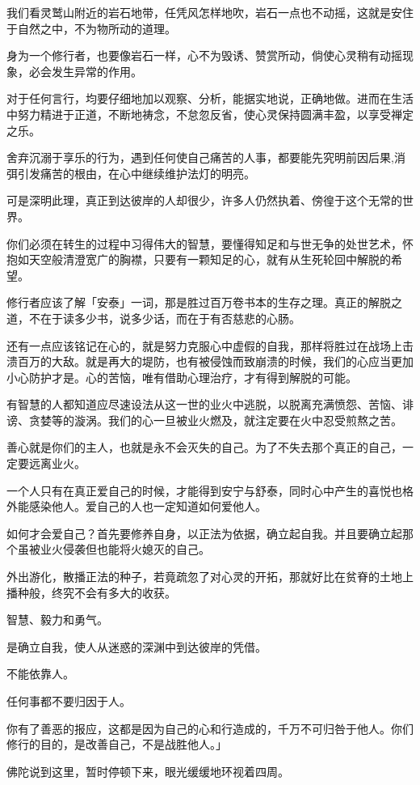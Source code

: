 \documentclass[twoside,openany]{book}
\begin{document}
我们看灵鹫山附近的岩石地带，任凭风怎样地吹，岩石一点也不动摇，这就是安住于自然之中，不为物所动的道理。

身为一个修行者，也要像岩石一样，心不为毁诱、赞赏所动，倘使心灵稍有动摇现象，必会发生异常的作用。

对于任何言行，均要仔细地加以观察、分析，能据实地说，正确地做。进而在生活中努力精进于正道，不断地祷念，不怠忽反省，使心灵保持圆满丰盈，以享受禅定之乐。

舍弃沉溺于享乐的行为，遇到任何使自己痛苦的人事，都要能先究明前因后果,消弭引发痛苦的根由，在心中继续维护法灯的明亮。

可是深明此理，真正到达彼岸的人却很少，许多人仍然执着、傍徨于这个无常的世界。

你们必须在转生的过程中习得伟大的智慧，要懂得知足和与世无争的处世艺术，怀抱如天空般清澄宽广的胸襟，只要有一颗知足的心，就有从生死轮回中解脱的希望。

修行者应该了解「安泰」一词，那是胜过百万卷书本的生存之理。真正的解脱之道，不在于读多少书，说多少话，而在于有否慈悲的心肠。

还有一点应该铭记在心的，就是努力克服心中虚假的自我，那样将胜过在战场上击溃百万的大敌。就是再大的堤防，也有被侵蚀而致崩溃的时候，我们的心应当更加小心防护才是。心的苦恼，唯有借助心理治疗，才有得到解脱的可能。

有智慧的人都知道应尽速设法从这一世的业火中逃脱，以脱离充满愤怨、苦恼、诽谤、贪婪等的漩涡。我们的心一旦被业火燃及，就注定要在火中忍受煎熬之苦。

善心就是你们的主人，也就是永不会灭失的自己。为了不失去那个真正的自己，一定要远离业火。

一个人只有在真正爱自己的时候，才能得到安宁与舒泰，同时心中产生的喜悦也格外能感染他人。爱自己的人也一定知道如何爱他人。

如何才会爱自己？首先要修养自身，以正法为依据，确立起自我。并且要确立起那个虽被业火侵袭但也能将火媳灭的自己。

外出游化，散播正法的种子，若竟疏忽了对心灵的开拓，那就好比在贫脊的土地上播种般，终究不会有多大的收获。

智慧、毅力和勇气。

是确立自我，使人从迷惑的深渊中到达彼岸的凭借。

不能依靠人。

任何事都不要归因于人。

你有了善恶的报应，这都是因为自己的心和行造成的，千万不可归咎于他人。你们修行的目的，是改善自己，不是战胜他人。」

佛陀说到这里，暂时停顿下来，眼光缓缓地环视着四周。
\end{document}
